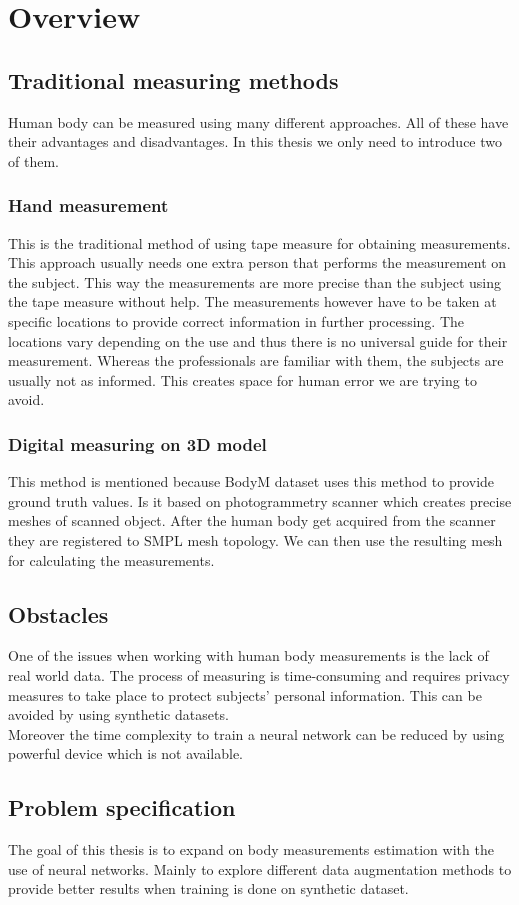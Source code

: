 \chapter{Overview}
\section{Traditional measuring methods}
Human body can be measured using many different approaches. All of these have their advantages and disadvantages. In this thesis we only need to introduce two of them.
\subsection{Hand measurement}
This is the traditional method of using tape measure for obtaining measurements. This approach usually needs one extra person that performs the measurement on the subject. This way the measurements are more precise than the subject using the tape measure without help. The measurements however have to be taken at specific locations to provide correct information in further processing. The locations vary depending on the use and thus there is no universal guide for their measurement. Whereas the professionals are familiar with them, the subjects are usually not as informed. This creates space for human error we are trying to avoid.
\subsection{Digital measuring on 3D model}
This method is mentioned because BodyM dataset uses this method to provide ground truth values. Is it based on photogrammetry scanner which creates precise meshes of scanned object. After the human body get acquired from the scanner they are registered to SMPL mesh topology. We can then use the resulting mesh for calculating the measurements.
\section{Obstacles}
One of the issues when working with human body measurements is the lack of real world data. The process of measuring is time-consuming and requires privacy measures to take place to protect subjects' personal information. This can be avoided by using synthetic datasets.\\
Moreover the time complexity to train a neural network can be reduced by using powerful device which is not available.
\section{Problem specification}
The goal of this thesis is to expand on body measurements estimation with the use of neural networks. Mainly to explore different data augmentation methods to provide better results when training is done on synthetic dataset.
